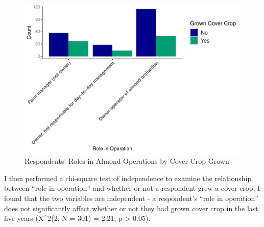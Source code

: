 \documentclass[12pt,]{article}
\newenvironment{Shaded}{\begin{snugshade}}{\end{snugshade}}
\newcommand{\KeywordTok}[1]{\textcolor[rgb]{0.13,0.29,0.53}{\textbf{#1}}}
\newcommand{\StringTok}[1]{\textcolor[rgb]{0.31,0.60,0.02}{#1}}
\newcommand{\CommentTok}[1]{\textcolor[rgb]{0.56,0.35,0.01}{\textit{#1}}}
\newcommand{\OperatorTok}[1]{\textcolor[rgb]{0.81,0.36,0.00}{\textbf{#1}}}
\newcommand{\NormalTok}[1]{#1}
\begin{document}
\begin{figure}
\centering
\includegraphics{Project_Template_files/figure-latex/Question 2 Plot-1.pdf}
\caption{Respondents' Roles in Almond Operations by Cover Crop Grown}
\end{figure}

\FloatBarrier

I then performed a chi-square test of independence to examine the
relationship between ``role in operation'' and whether or not a
respondent grew a cover crop. I found that the two variables are
independent - a respondent's ``role in operation'' does not
significantly affect whether or not they had grown cover crop in the
last five years (X\^{}2(2, N = 301) = 2.21, p \textgreater{} 0.05).

\begin{Shaded}
\end{Shaded}
\end{document}
